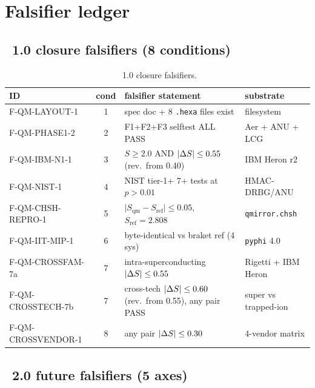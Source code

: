 \section{Falsifier ledger}\label{app:falsifiers}

\subsection{\qmirror{}~1.0 closure falsifiers (8 conditions)}

\begin{table}[htbp]
\centering
\caption{\qmirror{}~1.0 closure falsifiers.}
\label{tab:falsifiers_v1}
\scriptsize
\begin{tabular}{l c l l}
\toprule
ID & cond & falsifier statement & substrate \\
\midrule
F-QM-LAYOUT-1     & 1 & spec doc + 8 \texttt{.hexa} files exist        & filesystem \\
F-QM-PHASE1-2     & 2 & F1+F2+F3 selftest ALL PASS                     & Aer + ANU + LCG \\
F-QM-IBM-N1-1     & 3 & $S \ge 2.0$ AND $\lvert\Delta S\rvert \le 0.55$ (rev.\ from 0.40) & IBM Heron r2 \\
F-QM-NIST-1       & 4 & NIST tier-1+ 7+ tests at $p > 0.01$            & HMAC-DRBG/ANU \\
F-QM-CHSH-REPRO-1 & 5 & $\lvert S_{\text{qm}} - S_{\text{ref}}\rvert \le 0.05$, $S_{\text{ref}} = 2.808$ & \texttt{qmirror.chsh} \\
F-QM-IIT-MIP-1    & 6 & \phistar{} byte-identical vs braket ref (4 sys) & \texttt{pyphi} 4.0 \\
F-QM-CROSSFAM-7a  & 7 & intra-superconducting $\lvert\Delta S\rvert \le 0.55$            & Rigetti + IBM Heron \\
F-QM-CROSSTECH-7b & 7 & cross-tech $\lvert\Delta S\rvert \le 0.60$ (rev.\ from 0.55), any pair PASS & super vs trapped-ion \\
F-QM-CROSSVENDOR-1 & 8 & any pair $\lvert\Delta S\rvert \le 0.30$                       & 4-vendor matrix \\
\bottomrule
\end{tabular}
\end{table}

\subsection{\qmirror{}~2.0 future falsifiers (5 axes)}

